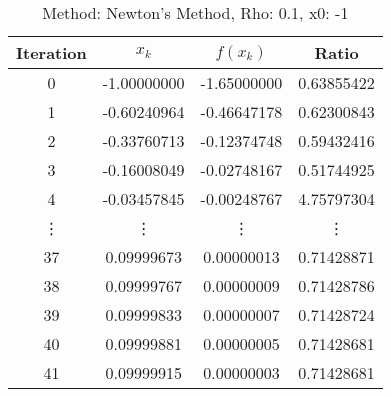 \begin{table}
\centering
\caption{Method: Newton's Method, Rho: 0.1, x0: -1}
\label{tab:table_Newton's_Method_0_1_-1}
\begin{tabular}{c c c c}
\toprule
Iteration &       $x_k$ &    $f(x_k)$ &      Ratio \\
\midrule
        0 & -1.00000000 & -1.65000000 & 0.63855422 \\
        1 & -0.60240964 & -0.46647178 & 0.62300843 \\
        2 & -0.33760713 & -0.12374748 & 0.59432416 \\
        3 & -0.16008049 & -0.02748167 & 0.51744925 \\
        4 & -0.03457845 & -0.00248767 & 4.75797304 \\
   \vdots &      \vdots &      \vdots &     \vdots \\
       37 &  0.09999673 &  0.00000013 & 0.71428871 \\
       38 &  0.09999767 &  0.00000009 & 0.71428786 \\
       39 &  0.09999833 &  0.00000007 & 0.71428724 \\
       40 &  0.09999881 &  0.00000005 & 0.71428681 \\
       41 &  0.09999915 &  0.00000003 & 0.71428681 \\
\bottomrule
\end{tabular}
\end{table}
